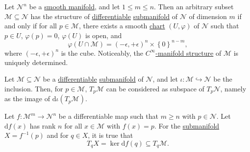 \begin{remark}
	Let \(\mathcal{N}^n \) be a \hyperref[def:smooth-manifold]{smooth manifold}, and let \(1 \leq m \leq n\). Then an arbitrary subset \(\mathcal{M} \subseteq \mathcal{N} \) has the structure of \hyperref[def:smooth-manifold]{differentiable} \hyperref[def:submanifold]{submanifold} of \(\mathcal{N} \) of dimension \(m\) if and only if for all \(p\in \mathcal{M}\), there exists a smooth \hyperref[def:coordinate-chart]{chart} \((U, \varphi )\) of \(\mathcal{N} \) such that \(p\in U\), \(\varphi (p) = 0\), \(\varphi (U)\) is open, and
	\[
		\varphi (U \cap \mathcal{M} ) = (-\epsilon , +\epsilon )^n \times \left\{0\right\} ^{n - m},
	\]
	where \((-\epsilon , +\epsilon )^n\) is the cube. Noticeably, the \hyperref[def:smooth-structure]{\(C^{\infty} \)-manifold structure} of \(\mathcal{M} \) is uniquely determined.
\end{remark}

\begin{remark}
	Let \(\mathcal{M} \subseteq \mathcal{N} \) be a \hyperref[def:smooth-manifold]{differentiable} \hyperref[def:submanifold]{submanifold} of \(\mathcal{N} \), and let \(\iota \colon \mathcal{M} \hookrightarrow \mathcal{N} \) be the inclusion. Then, for \(p\in \mathcal{M} \), \(T_p \mathcal{M} \) can be considered as subspace of \(T_p \mathcal{N} \), namely as the image of \(\mathrm{d} \iota (T_p \mathcal{M} )\).
\end{remark}

\begin{lemma}
	Let \(f\colon \mathcal{M}^m \to \mathcal{N}^n \) be a differentiable map such that \(m \geq n\) with \(p\in \mathcal{N} \). Let \(\mathrm{d} f(x)\) has rank \(n\) for all \(x\in \mathcal{M} \) with \(f(x) = p\). For the \hyperref[def:submanifold]{submanifold} \(X = f^{-1} (p)\) and for \(q\in X\), it is true that
	\[
		T_q X = \ker \mathrm{d} f(q) \subseteq T_q \mathcal{M} .
	\]
\end{lemma}